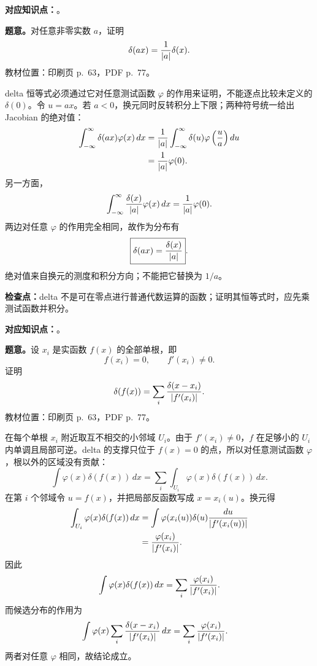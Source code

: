 
\textbf{对应知识点：}。

\textbf{题意。}对任意非零实数 $a$，证明
\[
  \delta(ax)=\frac1{\left|a\right|}\delta(x).
\]
教材位置：印刷页 p.~63，PDF p.~77。

\begin{checkedsolution}
delta 恒等式必须通过它对任意测试函数 $\varphi$ 的作用来证明，不能逐点比较未定义的 $\delta(0)$。令 $u=ax$。若 $a<0$，换元同时反转积分上下限；两种符号统一给出 Jacobian 的绝对值：
\begin{align*}
  \int_{-\infty}^{\infty}\delta(ax)\varphi(x)\,dx
  &=\frac1{\left|a\right|}
    \int_{-\infty}^{\infty}
    \delta(u)\varphi\left(\frac{u}{a}\right)du\\
  &=\frac1{\left|a\right|}\varphi(0).
\end{align*}
另一方面，
\[
  \int_{-\infty}^{\infty}
  \frac{\delta(x)}{\left|a\right|}\varphi(x)\,dx
  =\frac1{\left|a\right|}\varphi(0).
\]
两边对任意 $\varphi$ 的作用完全相同，故作为分布有
\[
  \boxed{\delta(ax)=\frac{\delta(x)}{\left|a\right|}}.
\]
绝对值来自换元的测度和积分方向；不能把它替换为 $1/a$。
\end{checkedsolution}

\textbf{检查点：}delta 不是可在零点进行普通代数运算的函数；证明其恒等式时，应先乘测试函数并积分。


\textbf{对应知识点：}。

\textbf{题意。}设 $x_i$ 是实函数 $f(x)$ 的全部单根，即
\[
  f(x_i)=0,
  \qquad f'(x_i)\neq0.
\]
证明
\[
  \delta(f(x))
  =\sum_i\frac{\delta(x-x_i)}{\left|f'(x_i)\right|}.
\]
教材位置：印刷页 p.~63，PDF p.~77。

\begin{checkedsolution}
在每个单根 $x_i$ 附近取互不相交的小邻域 $U_i$。由于 $f'(x_i)\neq0$，$f$ 在足够小的 $U_i$ 内单调且局部可逆。delta 的支撑只位于 $f(x)=0$ 的点，所以对任意测试函数 $\varphi$，根以外的区域没有贡献：
\[
  \int\varphi(x)\delta(f(x))\,dx
  =\sum_i\int_{U_i}\varphi(x)\delta(f(x))\,dx.
\]
在第 $i$ 个邻域令 $u=f(x)$，并把局部反函数写成 $x=x_i(u)$。换元得
\begin{align*}
  \int_{U_i}\varphi(x)\delta(f(x))\,dx
  &=\int
    \varphi(x_i(u))\delta(u)
    \frac{du}{\left|f'(x_i(u))\right|}\\
  &=\frac{\varphi(x_i)}{\left|f'(x_i)\right|}.
\end{align*}
因此
\begin{equation*}
  \int\varphi(x)\delta(f(x))\,dx
  =\sum_i\frac{\varphi(x_i)}{\left|f'(x_i)\right|}.
\end{equation*}
而候选分布的作用为
\begin{align*}
  \int\varphi(x)
  \sum_i\frac{\delta(x-x_i)}{\left|f'(x_i)\right|}\,dx
  &=\sum_i\frac{\varphi(x_i)}{\left|f'(x_i)\right|}.
\end{align*}
两者对任意 $\varphi$ 相同，故结论成立。
\end{checkedsolution}

